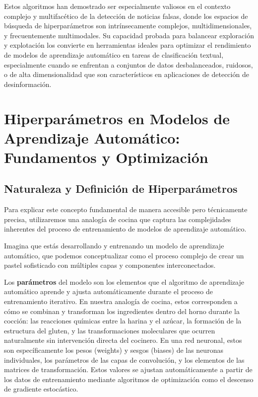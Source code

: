 Estos algoritmos han demostrado ser especialmente valiosos en el contexto complejo y multifacético de la detección de noticias falsas, donde los espacios de búsqueda de hiperparámetros son intrínsecamente complejos, multidimensionales, y frecuentemente multimodales. Su capacidad probada para balancear exploración y explotación los convierte en herramientas ideales para optimizar el rendimiento de modelos de aprendizaje automático en tareas de clasificación textual, especialmente cuando se enfrentan a conjuntos de datos desbalanceados, ruidosos, o de alta dimensionalidad que son característicos en aplicaciones de detección de desinformación.

\section{Hiperparámetros en Modelos de Aprendizaje Automático: Fundamentos y Optimización}
\label{sec:hiperparametros}

\subsection{Naturaleza y Definición de Hiperparámetros}

Para explicar este concepto fundamental de manera accesible pero técnicamente precisa, utilizaremos una analogía de cocina que captura las complejidades inherentes del proceso de entrenamiento de modelos de aprendizaje automático.

Imagina que estás desarrollando y entrenando un modelo de aprendizaje automático, que podemos conceptualizar como el proceso complejo de crear un pastel sofisticado con múltiples capas y componentes interconectados.

Los \textbf{parámetros} del modelo son los elementos que el algoritmo de aprendizaje automático aprende y ajusta automáticamente durante el proceso de entrenamiento iterativo. En nuestra analogía de cocina, estos corresponden a cómo se combinan y transforman los ingredientes dentro del horno durante la cocción: las reacciones químicas entre la harina y el azúcar, la formación de la estructura del gluten, y las transformaciones moleculares que ocurren naturalmente sin intervención directa del cocinero. En una red neuronal, estos son específicamente los pesos (weights) y sesgos (biases) de las neuronas individuales, los parámetros de las capas de convolución, y los elementos de las matrices de transformación. Estos valores se ajustan automáticamente a partir de los datos de entrenamiento mediante algoritmos de optimización como el descenso de gradiente estocástico.

